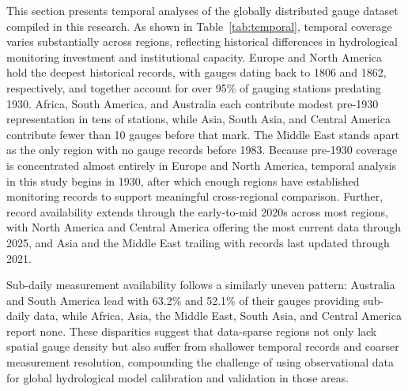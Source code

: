 This section presents temporal analyses of the globally distributed gauge dataset compiled in this research. As shown in Table~\ref{tab:temporal}, temporal coverage varies substantially across regions, reflecting historical differences in hydrological monitoring investment and institutional capacity. Europe and North America hold the deepest historical records, with gauges dating back to 1806 and 1862, respectively, and together account for over 95\% of gauging stations predating 1930. Africa, South America, and Australia each contribute modest pre-1930 representation in tens of stations, while Asia, South Asia, and Central America contribute fewer than 10 gauges before that mark. The Middle East stands apart as the only region with no gauge records before 1983. Because pre-1930 coverage is concentrated almost entirely in Europe and North America, temporal analysis in this study begins in 1930, after which enough regions have established monitoring records to support meaningful cross-regional comparison. Further, record availability extends through the early-to-mid 2020s across most regions, with North America and Central America offering the most current data through 2025, and Asia and the Middle East trailing with records last updated through 2021.

Sub-daily measurement availability follows a similarly uneven pattern: Australia and South America lead with 63.2\% and 52.1\% of their gauges providing sub-daily data, while Africa, Asia, the Middle East, South Asia, and Central America report none. These disparities suggest that data-sparse regions not only lack spatial gauge density but also suffer from shallower temporal records and coarser measurement resolution, compounding the challenge of using observational data for global hydrological model calibration and validation in those areas.

